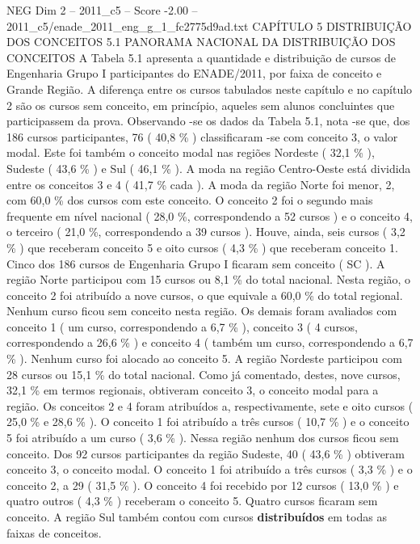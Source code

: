 \begin{textsample}{NEG Dim 2 – 2011\_c5 – Score -2.00 – 2011\_c5/enade\_2011\_eng\_g\_1\_fc2775d9ad.txt}  \label{ex:f2_neg_089}
CAPÍTULO 5 DISTRIBUIÇÃO DOS CONCEITOS 5.1 PANORAMA NACIONAL DA DISTRIBUIÇÃO DOS CONCEITOS A Tabela 5.1 apresenta a quantidade e distribuição de cursos de Engenharia Grupo I participantes do ENADE/2011, por faixa de conceito e Grande Região.
A diferença entre os cursos tabulados neste capítulo e no capítulo 2 são os cursos sem conceito, em princípio, aqueles sem alunos concluintes que participassem da prova.
Observando -se os dados da Tabela 5.1, nota -se que, dos 186 cursos participantes, 76 ( 40,8 \% ) classificaram -se com conceito 3, o valor modal.
Este foi também o conceito modal nas regiões Nordeste ( 32,1 \% ), Sudeste ( 43,6 \% ) e Sul ( 46,1 \% ).
A moda na região Centro-Oeste está dividida entre os conceitos 3 e 4 ( 41,7 \% cada ).
A moda da região Norte foi menor, 2, com 60,0 \% dos cursos com este conceito.
O conceito 2 foi o segundo mais frequente em nível nacional ( 28,0 \%, correspondendo a 52 cursos ) e o conceito 4, o terceiro ( 21,0 \%, correspondendo a 39 cursos ).
Houve, ainda, seis cursos ( 3,2 \% ) que receberam conceito 5 e oito cursos ( 4,3 \% ) que receberam conceito 1.
Cinco dos 186 cursos de Engenharia Grupo I ficaram sem conceito ( SC ).
A região Norte participou com 15 cursos ou 8,1 \% do total nacional.
Nesta região, o conceito 2 foi atribuído a nove cursos, o que equivale a 60,0 \% do total regional.
Nenhum curso ficou sem conceito nesta região.
Os demais foram avaliados com conceito 1 ( um curso, correspondendo a 6,7 \% ), conceito 3 ( 4 cursos, correspondendo a 26,6 \% ) e conceito 4 ( também um curso, correspondendo a 6,7 \% ).
Nenhum curso foi alocado ao conceito 5.
A região Nordeste participou com 28 cursos ou 15,1 \% do total nacional.
Como já comentado, destes, nove cursos, 32,1 \% em termos regionais, obtiveram conceito 3, o conceito modal para a região.
Os conceitos 2 e 4 foram atribuídos a, respectivamente, sete e oito cursos ( 25,0 \% e 28,6 \% ).
O conceito 1 foi atribuído a três cursos ( 10,7 \% ) e o conceito 5 foi atribuído a um curso ( 3,6 \% ).
Nessa região nenhum dos cursos ficou sem conceito.
Dos 92 cursos participantes da região Sudeste, 40 ( 43,6 \% ) obtiveram conceito 3, o conceito modal.
O conceito 1 foi atribuído a três cursos ( 3,3 \% ) e o conceito 2, a 29 ( 31,5 \% ).
O conceito 4 foi recebido por 12 cursos ( 13,0 \% ) e quatro outros ( 4,3 \% ) receberam o conceito 5.
Quatro cursos ficaram sem conceito.
A região Sul também contou com cursos \textbf{distribuídos} em todas as faixas de conceitos.

\end{textsample}
